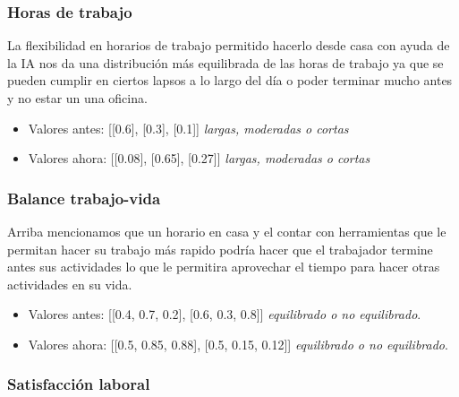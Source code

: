 \subsubsection*{Horas de trabajo}
La flexibilidad en horarios de trabajo permitido hacerlo desde casa con ayuda de la IA nos 
da una distribución más equilibrada de las horas de trabajo ya que se pueden cumplir en 
ciertos lapsos a lo largo del día o poder terminar mucho antes y no estar un una oficina.

\begin{itemize}
    \item Valores antes: [[0.6], [0.3], [0.1]] \textit{largas, moderadas o cortas}
    \item Valores ahora: [[0.08], [0.65], [0.27]] \textit{largas, moderadas o cortas}
\end{itemize}


\subsubsection*{Balance trabajo-vida}
Arriba mencionamos que un horario en casa y el contar con herramientas que le permitan hacer
su trabajo más rapido podría hacer que el trabajador termine antes sus actividades lo que 
le permitira aprovechar el tiempo para hacer otras actividades en su vida.

\begin{itemize}
    \item Valores antes: [[0.4, 0.7, 0.2], [0.6, 0.3, 0.8]] \textit{equilibrado o no equilibrado}.
    \item Valores ahora: [[0.5, 0.85, 0.88], [0.5, 0.15, 0.12]] \textit{equilibrado o no equilibrado}.
\end{itemize}

\subsubsection*{Satisfacción laboral}

